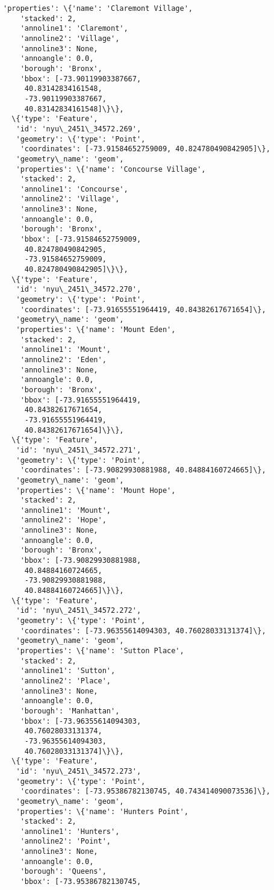 \documentclass[11pt]{article}
\begin{document}
\begin{tcolorbox}[breakable, size=fbox, boxrule=.5pt, pad at break*=1mm, opacityfill=0]
\begin{Verbatim}[commandchars=\\\{\}]
   'properties': \{'name': 'Claremont Village',
    'stacked': 2,
    'annoline1': 'Claremont',
    'annoline2': 'Village',
    'annoline3': None,
    'annoangle': 0.0,
    'borough': 'Bronx',
    'bbox': [-73.90119903387667,
     40.83142834161548,
     -73.90119903387667,
     40.83142834161548]\}\},
  \{'type': 'Feature',
   'id': 'nyu\_2451\_34572.269',
   'geometry': \{'type': 'Point',
    'coordinates': [-73.91584652759009, 40.824780490842905]\},
   'geometry\_name': 'geom',
   'properties': \{'name': 'Concourse Village',
    'stacked': 2,
    'annoline1': 'Concourse',
    'annoline2': 'Village',
    'annoline3': None,
    'annoangle': 0.0,
    'borough': 'Bronx',
    'bbox': [-73.91584652759009,
     40.824780490842905,
     -73.91584652759009,
     40.824780490842905]\}\},
  \{'type': 'Feature',
   'id': 'nyu\_2451\_34572.270',
   'geometry': \{'type': 'Point',
    'coordinates': [-73.91655551964419, 40.84382617671654]\},
   'geometry\_name': 'geom',
   'properties': \{'name': 'Mount Eden',
    'stacked': 2,
    'annoline1': 'Mount',
    'annoline2': 'Eden',
    'annoline3': None,
    'annoangle': 0.0,
    'borough': 'Bronx',
    'bbox': [-73.91655551964419,
     40.84382617671654,
     -73.91655551964419,
     40.84382617671654]\}\},
  \{'type': 'Feature',
   'id': 'nyu\_2451\_34572.271',
   'geometry': \{'type': 'Point',
    'coordinates': [-73.90829930881988, 40.84884160724665]\},
   'geometry\_name': 'geom',
   'properties': \{'name': 'Mount Hope',
    'stacked': 2,
    'annoline1': 'Mount',
    'annoline2': 'Hope',
    'annoline3': None,
    'annoangle': 0.0,
    'borough': 'Bronx',
    'bbox': [-73.90829930881988,
     40.84884160724665,
     -73.90829930881988,
     40.84884160724665]\}\},
  \{'type': 'Feature',
   'id': 'nyu\_2451\_34572.272',
   'geometry': \{'type': 'Point',
    'coordinates': [-73.96355614094303, 40.76028033131374]\},
   'geometry\_name': 'geom',
   'properties': \{'name': 'Sutton Place',
    'stacked': 2,
    'annoline1': 'Sutton',
    'annoline2': 'Place',
    'annoline3': None,
    'annoangle': 0.0,
    'borough': 'Manhattan',
    'bbox': [-73.96355614094303,
     40.76028033131374,
     -73.96355614094303,
     40.76028033131374]\}\},
  \{'type': 'Feature',
   'id': 'nyu\_2451\_34572.273',
   'geometry': \{'type': 'Point',
    'coordinates': [-73.95386782130745, 40.743414090073536]\},
   'geometry\_name': 'geom',
   'properties': \{'name': 'Hunters Point',
    'stacked': 2,
    'annoline1': 'Hunters',
    'annoline2': 'Point',
    'annoline3': None,
    'annoangle': 0.0,
    'borough': 'Queens',
    'bbox': [-73.95386782130745,

\end{Verbatim}
\end{tcolorbox}
\end{document}
